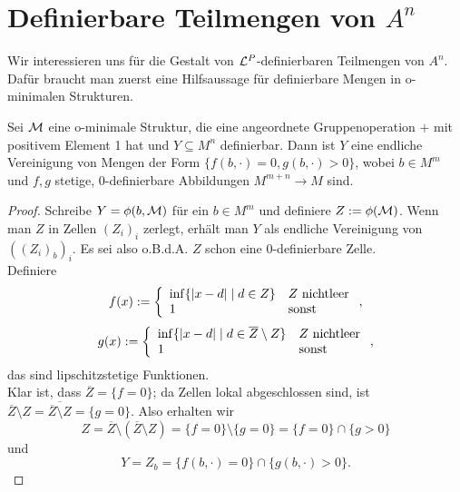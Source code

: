 \section{Definierbare Teilmengen von $A^n$}
Wir interessieren uns für die Gestalt von $\mathcal{L}^P$-definierbaren Teilmengen von $A^n$. Dafür braucht man zuerst eine Hilfsaussage für definierbare Mengen in o-minimalen Strukturen.

\begin{lemma}
	Sei $\mathcal{M}$ eine o-minimale Struktur, die eine angeordnete Gruppenoperation $+$ mit positivem Element 1 hat und $Y\subseteq M^n$ definierbar. Dann ist $Y$ eine endliche Vereinigung von Mengen der Form $\{f(b,\cdot)=0,g(b,\cdot)>0\}$, wobei $b\in M^m$ und $f,g$ stetige, 0-definierbare Abbildungen $M^{m+n}\rightarrow M$ sind.
\end{lemma}
\begin{proof}
	Schreibe $Y=\phi(b,\mathcal{M})$ für ein $b\in M^m$ und definiere $Z:=\phi(\mathcal{M})$. Wenn man $Z$ in Zellen $(Z_i)_i$ zerlegt, erhält man $Y$ als endliche Vereinigung von $((Z_i)_b)_i$.  Es sei also o.B.d.A. $Z$ schon eine 0-definierbare Zelle.\\
	Definiere $$f(x):=\left\{\begin{array}{ll}
	\inf\{{\left| x-d \right|}\mid d\in Z\}&Z\text{ nichtleer}\\
	1&\text{sonst}
	\end{array}\right.,$$
	$$g(x):=\left\{\begin{array}{ll}
	\inf\{{\left| x-d \right|}\mid d\in \overline{Z}\setminus Z\}&Z\text{ nichtleer}\\
	1&\text{sonst}
	\end{array}\right.,$$ das sind lipschitzstetige Funktionen.\\
	Klar ist, dass $\overline{Z}=\{f=0\}$; da Zellen lokal abgeschlossen sind, ist $\overline{Z}\setminus Z=\overline{\overline{Z}\setminus Z}=\{g=0\}$. Also erhalten wir $$Z=\overline{Z}\setminus(\overline{Z}\setminus Z)=\{f=0\}\setminus\{g=0\}=\{f=0\}\cap\{g>0\}$$ und $$Y=Z_b=\{f(b,\cdot)=0\}\cap\{g(b,\cdot)>0\}.$$
\end{proof}

